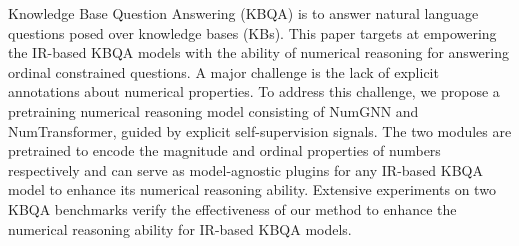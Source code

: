 Knowledge Base Question Answering (KBQA) is to answer natural language questions posed over knowledge bases (KBs). This paper targets at empowering the IR-based KBQA models with the ability of numerical reasoning for answering ordinal constrained questions. A major challenge is the lack of explicit annotations about numerical properties. To address this challenge, we propose a pretraining numerical reasoning model consisting of NumGNN and NumTransformer, guided by explicit self-supervision signals. The two modules are pretrained to encode the magnitude and ordinal properties of numbers respectively and can serve as model-agnostic plugins for any IR-based KBQA model to enhance its numerical reasoning ability. Extensive experiments on two KBQA benchmarks verify the effectiveness of our method to enhance the numerical reasoning ability for IR-based KBQA models.
